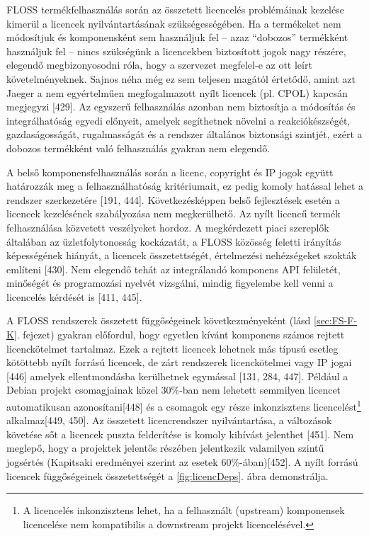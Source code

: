 \documentclass[12pt,magyar,a4paper,oneside]{scrreprt}
\begin{document}
FLOSS termékfelhasználás során az összetett licencelés problémáinak
kezelése kimerül a licencek nyilvántartásának szükségességében. Ha a
termékeket nem módosítjuk és komponensként sem használjuk fel -- azaz
``dobozos'' termékként használjuk fel -- nincs szükségünk a licencekben
biztosított jogok nagy részére, elegendő megbizonyosodni róla, hogy a
szervezet megfelel-e az ott leírt követelményeknek. Sajnos néha még ez
sem teljesen magától értetődő, amint azt Jaeger a nem egyértelműen
megfogalmazott nyílt licencek (pl. CPOL) kapcsán megjegyzi {[}429{]}. Az
egyszerű felhasználás azonban nem biztosítja a módosítás és
integrálhatóság egyedi előnyeit, amelyek segíthetnek növelni a
reakciókészségét, gazdaságosságát, rugalmasságát és a rendszer általános
biztonsági szintjét, ezért a dobozos termékként való felhasználás
gyakran nem elegendő.

A belső komponensfelhasználás során a licenc, copyright és IP jogok
együtt határozzák meg a felhasználhatóság kritériumait, ez pedig komoly
hatással lehet a rendszer szerkezetére {[}191, 444{]}. Következésképpen
belső fejlesztések esetén a licencek kezelésének szabályozása nem
megkerülhető. Az nyílt licencű termék felhasználása közvetett
veszélyeket hordoz. A megkérdezett piaci szereplők általában az
üzletfolytonosság kockázatát, a FLOSS közösség feletti irányítás
képességének hiányát, a licencek összetettségét, értelmezési
nehézségeket szokták említeni {[}430{]}. Nem elegendő tehát az
integrálandó komponens API felületét, minőségét és programozási nyelvét
vizsgálni, mindig figyelembe kell venni a licencelés kérdését is {[}411,
445{]}.

A FLOSS rendszerek összetett függőségeinek következményeként (lásd
\ref{sec:FS-F-K}. fejezet) gyakran előfordul, hogy egyetlen kívánt
komponens számos rejtett licenckötelmet tartalmaz. Ezek a rejtett
licencek lehetnek más típusú esetleg kötöttebb nyílt forrású licencek,
de zárt rendszerek licenckötelmei vagy IP jogai {[}446{]} amelyek
ellentmondásba kerülhetnek egymással {[}131, 284, 447{]}. Például a
Debian projekt csomagjainak közel 30\%-ban nem lehetett semmilyen
licencet automatikusan azonosítani{[}448{]} és a csomagok egy része
inkonzisztens licencelést\footnote{A licencelés inkonzisztens lehet, ha
  a felhasznált (upstream) komponensek licencelése nem kompatibilis a
  downstream projekt licencelésével.} alkalmaz{[}449, 450{]}. Az
összetett licencrendszer nyilvántartása, a változások követése sőt a
licencek puszta felderítése is komoly kihívást jelenthet {[}451{]}. Nem
meglepő, hogy a projektek jelentős részében jelentkezik valamilyen
szintű jogsértés (Kapitsaki eredményei szerint az esetek
60\%-ában){[}452{]}. A nyílt forrású licencek függőségeinek
összetettségét a \ref{fig:licencDeps}. ábra demonstrálja.
\end{document}
